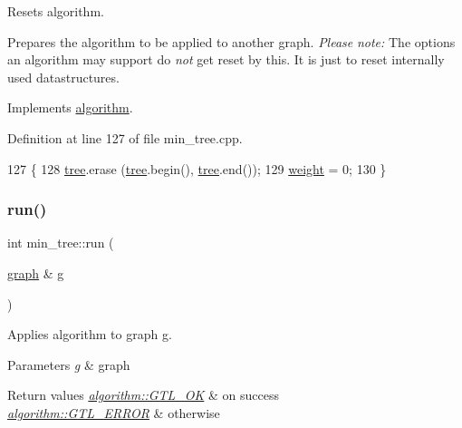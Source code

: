 Resets algorithm. 

Prepares the algorithm to be applied to another graph. {\itshape Please} {\itshape note\+:} The options an algorithm may support do {\itshape not} get reset by this. It is just to reset internally used datastructures. 

Implements \mbox{\hyperlink{classalgorithm_a21aba63d066ae7897de6ca7d8425c408}{algorithm}}.



Definition at line 127 of file min\+\_\+tree.\+cpp.


\begin{DoxyCode}
127                      \{
128     \mbox{\hyperlink{classmin__tree_a138e9248f851ee2562df6644626a1f0b}{tree}}.erase (\mbox{\hyperlink{classmin__tree_a138e9248f851ee2562df6644626a1f0b}{tree}}.begin(), \mbox{\hyperlink{classmin__tree_a138e9248f851ee2562df6644626a1f0b}{tree}}.end());
129     \mbox{\hyperlink{classmin__tree_a52112da027b950d45c177117444c5010}{weight}} = 0;
130 \}
\end{DoxyCode}
\mbox{\label{classmin__tree_ac025e8dad0db7a6a1e0e7b476b547802}} 
\subsubsection{\texorpdfstring{run()}{run()}}
{\footnotesize\ttfamily int min\+\_\+tree\+::run (\begin{DoxyParamCaption}\item[{\mbox{\hyperlink{classgraph}{graph}} \&}]{g }\end{DoxyParamCaption})\hspace{0.3cm}{\ttfamily [virtual]}}



Applies algorithm to graph g. 


\begin{DoxyParams}{Parameters}
{\em g} & graph \\
\hline
\end{DoxyParams}

\begin{DoxyRetVals}{Return values}
{\em \mbox{\hyperlink{classalgorithm_af1a0078e153aa99c24f9bdf0d97f6710a5114c20e4a96a76b5de9f28bf15e282b}{algorithm\+::\+G\+T\+L\+\_\+\+OK}}} & on success \\
\hline
{\em \mbox{\hyperlink{classalgorithm_af1a0078e153aa99c24f9bdf0d97f6710a6fcf574690bbd6cf710837a169510dd7}{algorithm\+::\+G\+T\+L\+\_\+\+E\+R\+R\+OR}}} & otherwise \\
\hline
\end{DoxyRetVals}


